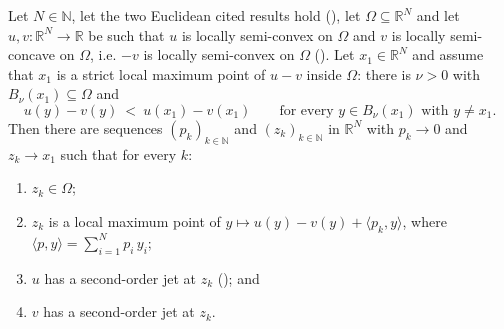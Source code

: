\begin{theorem}
Let $N\in\mathbb N$, let the two Euclidean cited results hold
(), let
$\Omega\subseteq\mathbb R^{N}$ and let $u,v:\mathbb R^{N}\to\mathbb R$ be such that $u$ is
locally semi-convex on $\Omega$ and $v$ is locally semi-concave on $\Omega$, i.e. $-v$ is
locally semi-convex on $\Omega$ (). Let
$x_1\in\mathbb R^{N}$ and assume that $x_1$ is a strict local maximum point of $u-v$ inside
$\Omega$: there is $\nu>0$ with $B_\nu(x_1)\subseteq\Omega$ and
\[
 u(y)-v(y)\ <\ u(x_1)-v(x_1)\qquad\text{for every }y\in B_\nu(x_1)\text{ with }y\ne x_1 .
\]
Then there are sequences $(p_k)_{k\in\mathbb N}$ and $(z_k)_{k\in\mathbb N}$ in
$\mathbb R^{N}$ with $p_k\to0$ and $z_k\to x_1$ such that for every $k$:
\begin{enumerate}
\item $z_k\in\Omega$;
\item $z_k$ is a local maximum point of
  $y\mapsto u(y)-v(y)+\langle p_k,y\rangle$, where
  $\langle p,y\rangle=\sum_{i=1}^{N}p_i\,y_i$;
\item $u$ has a second-order jet at $z_k$ (); and
\item $v$ has a second-order jet at $z_k$.
\end{enumerate}
\end{theorem}
